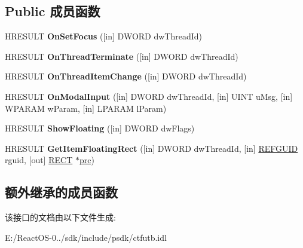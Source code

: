 \subsection*{Public 成员函数}
\begin{DoxyCompactItemize}
\item 
\mbox{\label{interface_i_tf_lang_bar_event_sink_a1374fd4ee8ea39d2b82c78b6a1f863cb}} 
H\+R\+E\+S\+U\+LT {\bfseries On\+Set\+Focus} (\mbox{[}in\mbox{]} D\+W\+O\+RD dw\+Thread\+Id)
\item 
\mbox{\label{interface_i_tf_lang_bar_event_sink_a4539c55bcaa46973f211db0e968559f0}} 
H\+R\+E\+S\+U\+LT {\bfseries On\+Thread\+Terminate} (\mbox{[}in\mbox{]} D\+W\+O\+RD dw\+Thread\+Id)
\item 
\mbox{\label{interface_i_tf_lang_bar_event_sink_a48abbdfaa7de5f290623fcbe5c5c4d06}} 
H\+R\+E\+S\+U\+LT {\bfseries On\+Thread\+Item\+Change} (\mbox{[}in\mbox{]} D\+W\+O\+RD dw\+Thread\+Id)
\item 
\mbox{\label{interface_i_tf_lang_bar_event_sink_a324d0794c9c08a57b78fbe38c0965bba}} 
H\+R\+E\+S\+U\+LT {\bfseries On\+Modal\+Input} (\mbox{[}in\mbox{]} D\+W\+O\+RD dw\+Thread\+Id, \mbox{[}in\mbox{]} U\+I\+NT u\+Msg, \mbox{[}in\mbox{]} W\+P\+A\+R\+AM w\+Param, \mbox{[}in\mbox{]} L\+P\+A\+R\+AM l\+Param)
\item 
\mbox{\label{interface_i_tf_lang_bar_event_sink_a6ba7ac16bebd94e252befb102b3917aa}} 
H\+R\+E\+S\+U\+LT {\bfseries Show\+Floating} (\mbox{[}in\mbox{]} D\+W\+O\+RD dw\+Flags)
\item 
\mbox{\label{interface_i_tf_lang_bar_event_sink_acc283d2d39f683c54f5a11d36f56bbd9}} 
H\+R\+E\+S\+U\+LT {\bfseries Get\+Item\+Floating\+Rect} (\mbox{[}in\mbox{]} D\+W\+O\+RD dw\+Thread\+Id, \mbox{[}in\mbox{]} \hyperlink{struct___g_u_i_d}{R\+E\+F\+G\+U\+ID} rguid, \mbox{[}out\mbox{]} \hyperlink{structtag_r_e_c_t}{R\+E\+CT} $\ast$\hyperlink{structtag_r_e_c_t}{prc})
\end{DoxyCompactItemize}
\subsection*{额外继承的成员函数}


该接口的文档由以下文件生成\+:\begin{DoxyCompactItemize}
\item 
E\+:/\+React\+O\+S-\/0../sdk/include/psdk/ctfutb.\+idl\end{DoxyCompactItemize}
